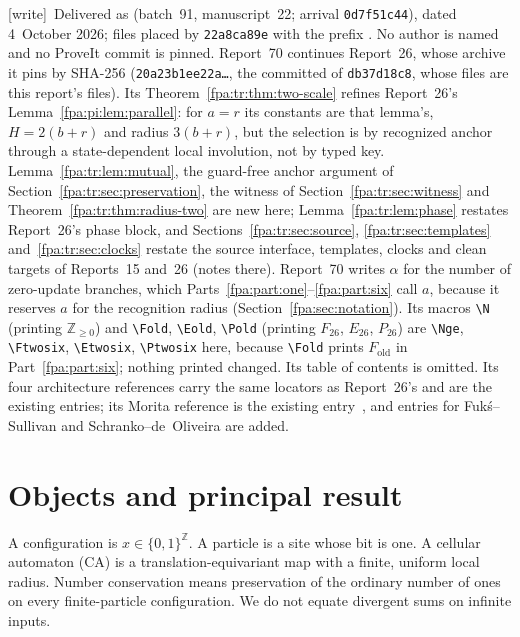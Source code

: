 \documentclass[11pt,a4paper]{article}
\numberwithin{equation}{section}
\newcommand{\N}{\mathbb N}\newcommand{\Z}{\mathbb Z}\newcommand{\R}{\mathbb R}
\newcommand{\Nge}{\mathbb Z_{\ge0}}\newcommand{\Nzero}{\mathbb N_0}
\newcommand{\X}{\{0,1\}^{\mathbb Z}}\newcommand{\id}{\operatorname{id}}
\newcommand{\Etwosix}{E_{26}}\newcommand{\Ptwosix}{P_{26}}\newcommand{\Ftwosix}{F_{26}}
\newcommand{\wtag}{\textup{[write]}}
\begin{document}
\wtag\ Delivered as  (batch~91, manuscript~22; arrival \texttt{0d7f51c44}), dated 4~October 2026; files placed by \texttt{22a8ca89e} with the prefix . No author is named and no ProveIt commit is pinned. Report~70 continues Report~26, whose archive it pins by SHA-256 (\texttt{20a23b1ee22a\ldots}, the committed  of \texttt{db37d18c8}, whose files are this report's  files). Its Theorem~\ref{fpa:tr:thm:two-scale} refines Report~26's Lemma~\ref{fpa:pi:lem:parallel}: for $a=r$ its constants are that lemma's, $H=2(b+r)$ and radius $3(b+r)$, but the selection is by recognized anchor through a state-dependent local involution, not by typed key. Lemma~\ref{fpa:tr:lem:mutual}, the guard-free anchor argument of Section~\ref{fpa:tr:sec:preservation}, the witness of Section~\ref{fpa:tr:sec:witness} and Theorem~\ref{fpa:tr:thm:radius-two} are new here; Lemma~\ref{fpa:tr:lem:phase} restates Report~26's phase block, and Sections~\ref{fpa:tr:sec:source}, \ref{fpa:tr:sec:templates} and~\ref{fpa:tr:sec:clocks} restate the source interface, templates, clocks and clean targets of Reports~15 and~26 (notes there). Report~70 writes $\alpha$ for the number of zero-update branches, which Parts~\ref{fpa:part:one}--\ref{fpa:part:six} call $a$, because it reserves $a$ for the recognition radius (Section~\ref{fpa:sec:notation}). Its macros \verb|\N| (printing $\mathbb Z_{\ge0}$) and \verb|\Fold|, \verb|\Eold|, \verb|\Pold| (printing $F_{26}$, $E_{26}$, $P_{26}$) are \verb|\Nge|, \verb|\Ftwosix|, \verb|\Etwosix|, \verb|\Ptwosix| here, because \verb|\Fold| prints $F_{\mathrm{old}}$ in Part~\ref{fpa:part:six}; nothing printed changed. Its table of contents is omitted. Its four architecture references carry the same locators as Report~26's and are the existing entries; its Morita reference is the existing entry~\cite{fpa:morita2012}, and entries for Fuk\'s--Sullivan and Schranko--de~Oliveira are added.

\section{Objects and principal result}\label{fpa:rep:70:first}\label{fpa:tr:sec:main}
A configuration is $x\in\X$. A particle is a site whose bit is one. A cellular automaton (CA) is a translation-equivariant map with a finite, uniform local radius. Number conservation means preservation of the ordinary number of ones on every finite-particle configuration. We do not equate divergent sums on infinite inputs.
\end{document}
